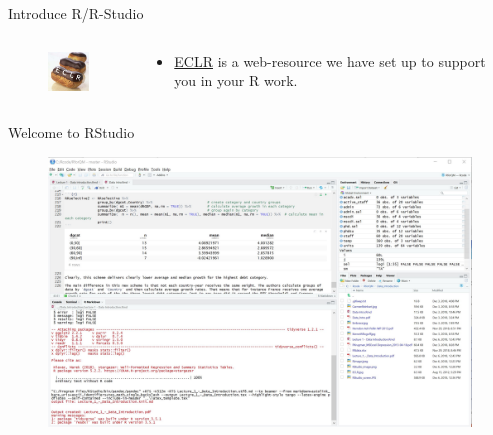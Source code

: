 \documentclass[
  ignorenonframetext,
]{beamer}
\begin{document}
\begin{frame}{Introduce R/R-Studio}
\begin{columns}
\begin{column}{0.8\textwidth}
  \end{column}
    
\end{columns}

\begin{columns}
  
  \begin{column}{0.2\textwidth}
    \begin{figure}
        \centering
        \includegraphics[width=2cm]{ECLR.jpg}\\
    \end{figure}

  \end{column}
  \begin{column}{0.8\textwidth}
    \begin{itemize}
      \item \href{http://eclr.humanities.manchester.ac.uk/index.php/R}{ECLR} is a web-resource we have set up to support you in your R work. 
    \end{itemize}
    
  \end{column}
    
\end{columns}
\end{frame}

\begin{frame}{Welcome to RStudio}
\protect\hypertarget{welcome-to-rstudio}{}
\begin{figure}
    \centering
    \includegraphics[width=12cm]{RStudio_screen.jpg}\\
\end{figure}
\end{frame}
\end{document}
